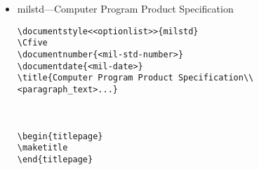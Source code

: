 \begin{itemize}
\begin{small}
\begin{verbatim}
\subsection{Introduction.}

\subsection{Test requirements.}

\subsection{Acceptance test requirements.}

\section{PREPARATION FOR DELIVERY}

\section{NOTES}

\appendix
%
% \section will now generate appendices starting with section 10, 20, etc.
%
\section{<text>} % Section 10, Appendix I

\section{<text>} % Section 20, Appendix II


\end{verbatim}
\end{small}

\item milstd---Computer Program Product Specification 

\begin{small}
\begin{verbatim}
\documentstyle<<optionlist>>{milstd}
\Cfive
\documentnumber{<mil-std-number>}
\documentdate{<mil-date>}
\title{Computer Program Product Specification\\
<paragraph_text>...}



\begin{titlepage}
\maketitle
\end{titlepage}


\end{verbatim}
\end{small}
\end{itemize}
